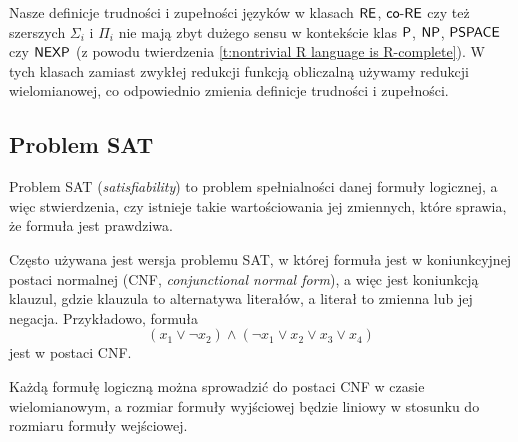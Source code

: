 Nasze definicje trudności i zupełności języków w klasach $\textsf{RE}$, $\textsf{co-RE}$ czy też szerszych $\Sigma_i$ i $\Pi_i$ nie mają zbyt dużego sensu w kontekście klas $\textsf{P}$, $\textsf{NP}$, $\textsf{PSPACE}$ czy $\textsf{NEXP}$ (z powodu twierdzenia \ref{t:nontrivial R language is R-complete}). W tych klasach zamiast zwykłej redukcji funkcją obliczalną używamy redukcji wielomianowej, co odpowiednio zmienia definicje trudności i zupełności.

\subsection{Problem SAT}

Problem SAT (\textit{satisfiability}) to problem spełnialności danej formuły logicznej, a więc stwierdzenia, czy istnieje takie wartościowania jej zmiennych, które sprawia, że formuła jest prawdziwa.

Często używana jest wersja problemu SAT, w której formuła jest w koniunkcyjnej postaci normalnej (CNF, \textit{conjunctional normal form}), a więc jest koniunkcją klauzul, gdzie klauzula to alternatywa literałów, a literał to zmienna lub jej negacja. Przykładowo, formuła
\[ (x_1 \lor \neg x_2) \land (\neg x_1 \lor x_2 \lor x_3 \lor x_4) \]
jest w postaci CNF.

\begin{fact}
    Każdą formułę logiczną można sprowadzić do postaci CNF w czasie wielomianowym, a rozmiar formuły wyjściowej będzie liniowy w stosunku do rozmiaru formuły wejściowej.
\end{fact}

